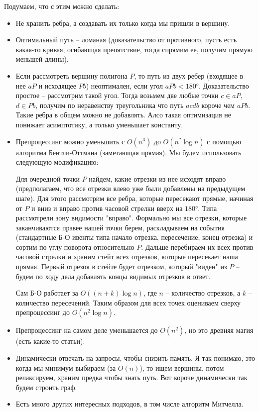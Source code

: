 \documentclass[11pt]{article}
\begin{document}
Подумаем, что с этим можно сделать:
\begin{itemize}
\item Не хранить ребра, а создавать их только когда мы пришли в вершину.
\item Оптимальный путь -- ломаная (доказательство от противного, пусть
есть какая-то кривая, огибающая препятствие, тогда спрямим ее,
получим прямую меньшей длины).
\item Если рассмотреть вершину полигона \(P\), то путь из двух ребер
(входящее в нее \(aP\) и исходящее \(Pb\)) неоптимален, если угол \(aPb
    < 180°\). Доказательство простое -- рассмотрим такой угол. Тогда
возьмем две любые точки \(c \in aP\), \(d \in Pb\), получим по неравенству
треугольника что путь \(acdb\) короче чем \(aPb\). Такие ребра в общем
можно не добавлять. Алсо такая оптимизация не понижает
асимптотику, а только уменьшает константу.
\item Препроцессинг можно уменьшить с \(O(n^3)\) до \(O(n^{?}\log{n})\) с
помощью алгоритма Бентли-Оттмана (заметающая прямая). Мы будем
использовать следующую модификацию:

Для очередной точки \(P\) найдем, какие отрезки из нее исходят
вправо (предполагаем, что все отрезки влево уже были добавлены на
предыдущем шаге). Для этого рассмотрим все ребра, которые
пересекают прямые, начиная от \(P\) и вниз и вправо против часовой
стрелки вверх на \(180°\). Типа рассмотрели зону видимости
"вправо". Формально мы все отрезки, которые заканчиваются правее
нашей точки берем, раскладываем на события (стандартные Б-О ивенты
типа начало отрезка, пересечение, конец отрезка) и сортим по углу
поворота относительно \(P\). Дальше перебираем их всех против
часовой стрелки и храним стейт всех отрезков, которые пересекает
наша прямая. Первый отрезок в стейте будет отрезком, который
"виден" из \(P\) -- будем по ходу дела добавлять концы видимых
отрезков в ответ.

Сам Б-О работает за \(O((n+k)\log{n})\), где \(n\) -- количество
отрезков, а \(k\) -- количество пересечений.  Таким образом для всех
точек оцениваем сверху препроцессинг до \(O(n^2\log{n})\).
\item Препроцессинг на самом деле уменьшается до \(O(n^2)\), но это
древняя магия (есть какие-то статьи).
\item Динамически отвечать на запросы, чтобы снизить память. Я так
понимаю, это когда мы минимум выбираем (за \(O(n)\)), то ищем
вершины, потом релаксируем, храним предка чтобы знать путь. Вот
короче динамически так будем строить граф.
\item Есть много других интересных подходов, в том числе алгоритм
Митчелла.
\end{itemize}
\end{document}
